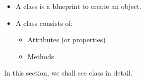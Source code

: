 \setlength{\columnsep}{3pt}
\begin{flushleft}
	
	\begin{itemize}
		\item A class is a blueprint to create an object.
		\item A class consists of:
		\begin{itemize}
			\item Attributes (or properties)
			\item Methods
		\end{itemize}
	\end{itemize}	
	In this section, we shall see class in detail.
	
\end{flushleft}

\newpage

